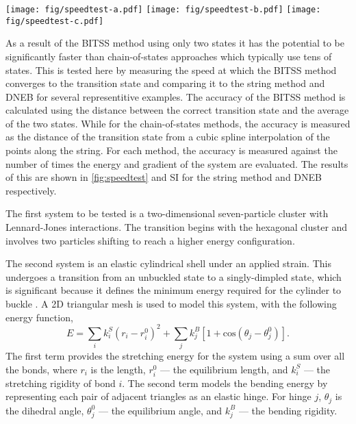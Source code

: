 \documentclass[aps,twocolumn]{revtex4}
\newcommand{\temp}[1]{{\leavevmode\color{red}#1}}
\begin{document}
\begin{figure*}[htb]
  \centering
  \texttt{[image: fig/speedtest-a.pdf]}%
  \texttt{[image: fig/speedtest-b.pdf]}%
  \texttt{[image: fig/speedtest-c.pdf]}%
  \caption{
    The rate of convergence to the transition state for (a) a Lennard-Jones seven-particle cluster, (b) cylindrical shell buckling, (c) wetting of a chemically-striped surface.
    Above are the two minimum energy states and the transition state between them.
    Below is shown the convergence to the transition state as a function of the number of gradient calculations using the BITSS (black line) and string methods.
    The string method is repeated with a differing number of images along the string, the number of which is listed in the legend in (c).
  }
  \label{fig:speedtest}
\end{figure*}

\topic As a result of the BITSS method using only two states it has the potential to be significantly faster than chain-of-states approaches which typically use tens of states.
This is tested here by measuring the speed at which the BITSS method converges to the transition state and comparing it to the string method and DNEB for several representitive examples.
The accuracy of the BITSS method is calculated using the distance between the correct transition state and the average of the two states.
While for the chain-of-states methods, the accuracy is measured as the distance of the transition state from a cubic spline interpolation of the points along the string.
For each method, the accuracy is measured against the number of times the energy and gradient of the system are evaluated.
The results of this are shown in \cref{fig:speedtest} and \temp{SI} for the string method and DNEB respectively.

\topic The first system to be tested is a two-dimensional seven-particle cluster with Lennard-Jones interactions.
The transition begins with the hexagonal cluster and involves two particles shifting to reach a higher energy configuration.

\topic The second system is an elastic cylindrical shell under an applied strain.
This undergoes a transition from an unbuckled state to a singly-dimpled state, which is significant because it defines the minimum energy required for the cylinder to buckle \cite{Panter2019}.
A 2D triangular mesh is used to model this system, with the following energy function,
\begin{equation}
  E = \sum_i k^S_i (r_i - r^0_i)^2 + \sum_j k^B_j [1 + \text{cos}(\theta_j - \theta^0_j)].
\end{equation}
The first term provides the stretching energy for the system using a sum over all the bonds, where $r_i$ is the length, $r^0_i$ --- the equilibrium length, and $k^S_i$ --- the stretching rigidity of bond $i$.
The second term models the bending energy by representing each pair of adjacent triangles as an elastic hinge.
For hinge $j$, $\theta_j$ is the dihedral angle, $\theta^0_j$ --- the equilibrium angle, and $k^B_j$ --- the bending rigidity.
\end{document}
